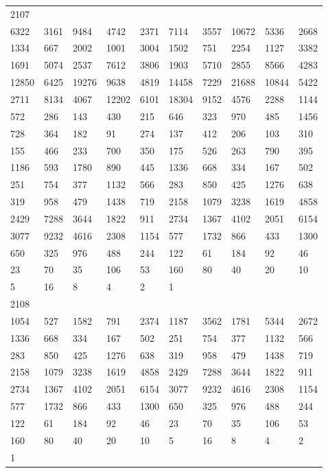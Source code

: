 \begin{longtable}{*{10}{l}}
2107&&&&&&&&&\\
6322& 3161& 9484& 4742& 2371& 7114& 3557& 10672& 5336& 2668\\
1334& 667& 2002& 1001& 3004& 1502& 751& 2254& 1127& 3382\\
1691& 5074& 2537& 7612& 3806& 1903& 5710& 2855& 8566& 4283\\
12850& 6425& 19276& 9638& 4819& 14458& 7229& 21688& 10844& 5422\\
2711& 8134& 4067& 12202& 6101& 18304& 9152& 4576& 2288& 1144\\
572& 286& 143& 430& 215& 646& 323& 970& 485& 1456\\
728& 364& 182& 91& 274& 137& 412& 206& 103& 310\\
155& 466& 233& 700& 350& 175& 526& 263& 790& 395\\
1186& 593& 1780& 890& 445& 1336& 668& 334& 167& 502\\
251& 754& 377& 1132& 566& 283& 850& 425& 1276& 638\\
319& 958& 479& 1438& 719& 2158& 1079& 3238& 1619& 4858\\
2429& 7288& 3644& 1822& 911& 2734& 1367& 4102& 2051& 6154\\
3077& 9232& 4616& 2308& 1154& 577& 1732& 866& 433& 1300\\
650& 325& 976& 488& 244& 122& 61& 184& 92& 46\\
23& 70& 35& 106& 53& 160& 80& 40& 20& 10\\
5& 16& 8& 4& 2& 1& \\

2108&&&&&&&&&\\
1054& 527& 1582& 791& 2374& 1187& 3562& 1781& 5344& 2672\\
1336& 668& 334& 167& 502& 251& 754& 377& 1132& 566\\
283& 850& 425& 1276& 638& 319& 958& 479& 1438& 719\\
2158& 1079& 3238& 1619& 4858& 2429& 7288& 3644& 1822& 911\\
2734& 1367& 4102& 2051& 6154& 3077& 9232& 4616& 2308& 1154\\
577& 1732& 866& 433& 1300& 650& 325& 976& 488& 244\\
122& 61& 184& 92& 46& 23& 70& 35& 106& 53\\
160& 80& 40& 20& 10& 5& 16& 8& 4& 2\\
1& \\


\end{longtable}
